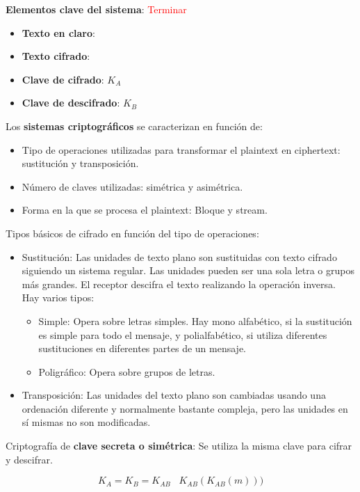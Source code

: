 \documentclass[10pt,portrait, twocolumn]{article}
\begin{document}
\textbf{Elementos clave del sistema}: 
	\textcolor{red}{Terminar}
	
	\begin{itemize}
		\item \textbf{Texto en claro}:
		\item \textbf{Texto cifrado}:
		\item \textbf{Clave de cifrado}: $K_{A}$
		\item \textbf{Clave de descifrado}: $K_{B}$
	\end{itemize}
	
Los \textbf{sistemas criptográficos} se caracterizan en función de:
	
	\begin{itemize}
		\item Tipo de operaciones utilizadas para transformar el plaintext en ciphertext: sustitución y transposición.
		\item Número de claves utilizadas: simétrica y asimétrica.
		\item Forma en la que se procesa el plaintext: Bloque y stream.
	\end{itemize}
	
	Tipos básicos de cifrado en función del tipo de operaciones:
	
	\begin{itemize}
		\item Sustitución: Las unidades de texto plano son sustituidas con texto cifrado siguiendo un sistema regular. Las unidades pueden ser una sola letra o grupos más grandes. El receptor descifra el texto realizando la operación inversa. Hay varios tipos:
			\begin{itemize}
				\item Simple: Opera sobre letras simples. Hay mono alfabético, si la sustitución es simple para todo el mensaje, y polialfabético, si utiliza diferentes sustituciones en diferentes partes de un mensaje.
				\item Poligráfico: Opera sobre grupos de letras.
			\end{itemize}
		\item Transposición: Las unidades del texto plano son cambiadas usando una ordenación diferente y normalmente bastante compleja, pero las unidades en sí mismas no son modificadas. 
	\end{itemize}
	
Criptografía de \textbf{clave secreta o simétrica}: Se utiliza la misma clave para cifrar y descifrar.

	\begin{equation*}
		K_A = K_B = K_{AB} \hspace{10pt} K_{AB} (K_{AB}(m)))
	\end{equation*}
	
\end{document}
